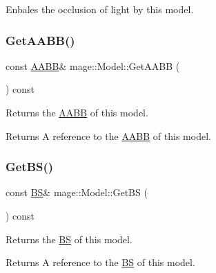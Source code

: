 Enbales the occlusion of light by this model. \hypertarget{classmage_1_1_model_a07af22d1e72ffde3ad33b709a8d5c7f4}{}\label{classmage_1_1_model_a07af22d1e72ffde3ad33b709a8d5c7f4} 
\subsubsection{\texorpdfstring{Get\+A\+A\+B\+B()}{GetAABB()}}
{\footnotesize\ttfamily const \hyperlink{structmage_1_1_a_a_b_b}{A\+A\+BB}\& mage\+::\+Model\+::\+Get\+A\+A\+BB (\begin{DoxyParamCaption}{ }\end{DoxyParamCaption}) const\hspace{0.3cm}{\ttfamily [noexcept]}}

Returns the \hyperlink{structmage_1_1_a_a_b_b}{A\+A\+BB} of this model.

\begin{DoxyReturn}{Returns}
A reference to the \hyperlink{structmage_1_1_a_a_b_b}{A\+A\+BB} of this model. 
\end{DoxyReturn}
\hypertarget{classmage_1_1_model_a7d99f18fd9cd6902795f77995b87bea2}{}\label{classmage_1_1_model_a7d99f18fd9cd6902795f77995b87bea2} 
\subsubsection{\texorpdfstring{Get\+B\+S()}{GetBS()}}
{\footnotesize\ttfamily const \hyperlink{structmage_1_1_b_s}{BS}\& mage\+::\+Model\+::\+Get\+BS (\begin{DoxyParamCaption}{ }\end{DoxyParamCaption}) const\hspace{0.3cm}{\ttfamily [noexcept]}}

Returns the \hyperlink{structmage_1_1_b_s}{BS} of this model.

\begin{DoxyReturn}{Returns}
A reference to the \hyperlink{structmage_1_1_b_s}{BS} of this model. 
\end{DoxyReturn}
\hypertarget{classmage_1_1_model_a46728db5ca9052c62e9403ec7d6a6c21}{}\label{classmage_1_1_model_a46728db5ca9052c62e9403ec7d6a6c21} 
